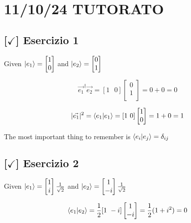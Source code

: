 \section{11/10/24 TUTORATO}

\subsection{[$\checkmark$] Esercizio 1}

Given $\ket{e_1} = \begin{bmatrix} 1 \\ 0 \\ \end{bmatrix}$ and $\ket{e_2} = \begin{bmatrix} 0 \\ 1 \\ \end{bmatrix}$

$$\vec{e_1}^{\dagger} \vec{e_2} = [1 \text{ } 0] \begin{bmatrix} 0 \\ 1 \\ \end{bmatrix} = 0 + 0 = 0$$

$$|\vec{e_1}|^2 = \braket{e_1|e_1} = [1 \text{ } 0] \begin{bmatrix} 1 \\ 0 \\ \end{bmatrix} = 1 + 0 = 1$$

The most important thing to remember is $\braket{e_i|e_j} = \delta_{ij}$

\subsection{[$\checkmark$] Esercizio 2}

Given $\ket{e_1} = \begin{bmatrix} 1 \\ i \\ \end{bmatrix}  \frac{1}{\sqrt{2}}$ and $\ket{e_2} = \begin{bmatrix} 1 \\ -i \\ \end{bmatrix} \frac{1}{\sqrt{2}}$

$$\braket{e_1|e_2} = \frac{1}{2} [1 \text{ } -i] \begin{bmatrix} 1 \\ -i \\ \end{bmatrix} = \frac{1}{2}(1+i^2) = 0$$

